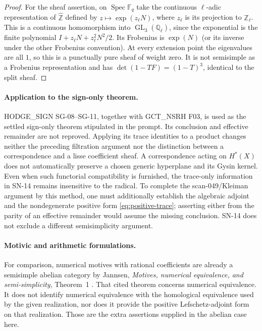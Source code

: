 \begin{proof}
For the sheaf assertion, on $\operatorname{Spec}\mathbb F_q$ take the
continuous $\ell$-adic representation of $\widehat{\mathbb Z}$ defined by
$z\mapsto\exp(z_\ell N)$, where $z_\ell$ is its projection to
$\mathbb Z_\ell$.  This is a continuous homomorphism into
$\operatorname{GL}_3(\mathbb Q_\ell)$, since the exponential is the finite
polynomial $I+z_\ell N+z_\ell^2N^2/2$.
Its Frobenius is $\exp(N)$ (or its inverse under the other
Frobenius convention).  At every extension point the eigenvalues are all
$1$, so this is a punctually pure sheaf of weight zero.  It is not
semisimple as a Frobenius representation and has
$\det(1-TF)=(1-T)^3$, identical to the split sheaf.
\end{proof}

\paragraph{Application to the sign-only theorem.}
HODGE\_SIGN SG-08--SG-11, together with GCT\_NSRH F03, is used as the
settled sign-only theorem stipulated in the prompt.  Its conclusion and
effective remainder are not reproved.  Applying its trace identities to
a product changes neither the preceding filtration argument nor the
distinction between a correspondence and a lisse coefficient sheaf.
A correspondence acting on $H^*(X)$ does not automatically preserve a
chosen generic hyperplane and its Gysin kernel.  Even when such
functorial compatibility is furnished, the trace-only information in
SN-14 remains insensitive to the radical.  To complete the
scan-049/Kleiman argument by this method, one must additionally establish
the algebraic adjoint and the nondegenerate positive form
\eqref{eq:positive-trace}; asserting either from the parity of an
effective remainder would assume the missing conclusion.  SN-14 does
not exclude a different semisimplicity argument.

\paragraph{Motivic and arithmetic formulations.}
For comparison, numerical motives with rational coefficients are already
a semisimple abelian category by Jannsen,
\emph{Motives, numerical equivalence, and semi-simplicity},
Theorem~1 \cite{Jannsen1992}.  That cited theorem concerns numerical
equivalence.  It does not identify numerical equivalence with the
homological equivalence used by the given realization, nor does it
provide the positive Lefschetz-adjoint form on that realization.
Those are the extra assertions supplied in the abelian case here.


